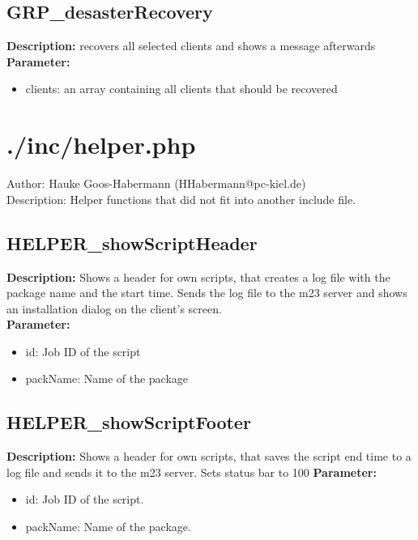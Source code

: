 \subsection{GRP\_desasterRecovery}
\textbf{Description:} recovers all selected clients and shows a message afterwards\\
\textbf{Parameter:}
\begin{itemize}
\item clients: an array containing all clients that should be recovered
\end{itemize}

\newpage\section{./inc/helper.php}
 Author: Hauke Goos-Habermann (HHabermann@pc-kiel.de)\\
 Description: Helper functions that did not fit into another include file.\\

\subsection{HELPER\_showScriptHeader}
\textbf{Description:} Shows a header for own scripts, that creates a log file with the package name and the start time. Sends the log file to the m23 server and shows an installation dialog on the client's screen.\\
\textbf{Parameter:}
\begin{itemize}
\item id: Job ID of the script
\item packName: Name of the package
\end{itemize}

\subsection{HELPER\_showScriptFooter}
\textbf{Description:} Shows a header for own scripts, that saves the script end time to a log file and sends it to the m23 server. Sets status bar to 100%
\textbf{Parameter:}
\begin{itemize}
\item id: Job ID of the script.
\item packName: Name of the package.
\end{itemize}

